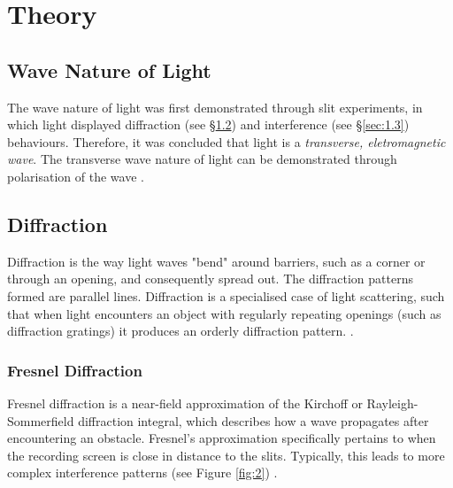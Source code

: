 \documentclass[12pt]{article}
\begin{document}
\tableofcontents
\thispagestyle{empty}

\newpage

\begin{abstract}
\thispagestyle{empty}



 
\end{abstract}
\newpage


\setcounter{page}{1}
\section{Theory} \label{sec:1}

\subsection{Wave Nature of Light}

The wave nature of light was first demonstrated through slit experiments, in which light displayed diffraction (see §\ref{sec:1.2}) and interference (see §\ref{sec:1.3}) behaviours. Therefore, it was concluded that light
is a \textit{transverse, eletromagnetic wave}. The transverse wave nature of light can be demonstrated through polarisation of the wave \cite{natureoflight}.

\subsection{Diffraction} \label{sec:1.2}

Diffraction is the way light waves "bend" around barriers, such as a corner or through an opening, and consequently spread out. The diffraction patterns formed are parallel lines.
Diffraction is a specialised case of light scattering, such that when light encounters an object with regularly repeating openings (such as diffraction gratings) it produces an orderly diffraction pattern.
\cite{diffraction1}. 

\subsubsection{Fresnel Diffraction}

Fresnel diffraction is a near-field approximation of the Kirchoff or Rayleigh-Sommerfield diffraction integral, which describes how a wave propagates after encountering an obstacle. Fresnel's approximation
specifically pertains to when the recording screen is close in distance to the slits. Typically, this leads to more complex interference patterns (see Figure \ref{fig:2}) \cite{fresnelfraunhofer}.
\end{document}
